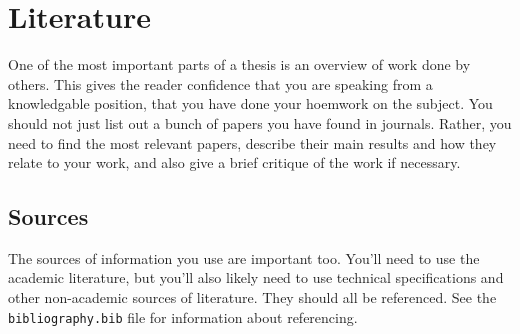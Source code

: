 \chapter{Literature}
\label{section:literature}

One of the most important parts of a thesis is an overview of work done by
others.
This gives the reader confidence that you are speaking from a knowledgable
position, that you have done your hoemwork on the subject.
You should not just list out a bunch of papers you have found in journals.
Rather, you need to find the most relevant papers, describe their main results
and how they relate to your work, and also give a brief critique of the work if
necessary.


\section{Sources}
The sources of information you use are important too.
You'll need to use the academic literature, but you'll also likely need to use
technical specifications and other non-academic sources of literature.
They should all be referenced.
See the \texttt{bibliography.bib} file for information about referencing.

\lipsum[16-25]

